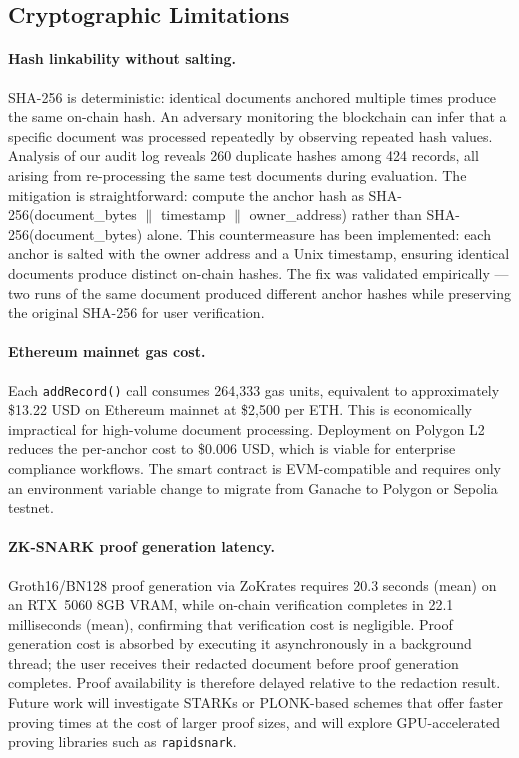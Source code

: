 \documentclass[conference]{IEEEtran}
\begin{document}
\subsection{Cryptographic Limitations}

\paragraph{Hash linkability without salting.}
SHA-256 is deterministic: identical documents
anchored multiple times produce the same on-chain
hash.
An adversary monitoring the blockchain can infer that
a specific document was processed repeatedly by
observing repeated hash values.
Analysis of our audit log reveals 260 duplicate hashes
among 424 records, all arising from re-processing the
same test documents during evaluation.
The mitigation is straightforward: compute the
anchor hash as SHA-256(document\_bytes $\|$ timestamp
$\|$ owner\_address) rather than SHA-256(document\_bytes)
alone.
This countermeasure has been implemented: each anchor
is salted with the owner address and a Unix timestamp,
ensuring identical documents produce distinct on-chain
hashes. The fix was validated empirically --- two runs
of the same document produced different anchor hashes
while preserving the original SHA-256 for user verification.

\paragraph{Ethereum mainnet gas cost.}
Each \texttt{addRecord()} call consumes 264,333 gas
units, equivalent to approximately \$13.22 USD on
Ethereum mainnet at \$2,500 per ETH.
This is economically impractical for high-volume
document processing.
Deployment on Polygon L2 reduces the per-anchor cost
to \$0.006 USD, which is viable for enterprise
compliance workflows.
The smart contract is EVM-compatible and requires
only an environment variable change to migrate from
Ganache to Polygon or Sepolia testnet.

\paragraph{ZK-SNARK proof generation latency.}
Groth16/BN128 proof generation via ZoKrates requires
20.3 seconds (mean) on an RTX~5060 8GB VRAM, while
on-chain verification completes in 22.1 milliseconds
(mean), confirming that verification cost is negligible.
Proof generation cost is absorbed by executing it
asynchronously in a background thread; the user
receives their redacted document before proof
generation completes.
Proof availability is therefore delayed relative to
the redaction result.
Future work will investigate STARKs or PLONK-based
schemes that offer faster proving times at the cost
of larger proof sizes, and will explore GPU-accelerated
proving libraries such as \texttt{rapidsnark}.
\end{document}
